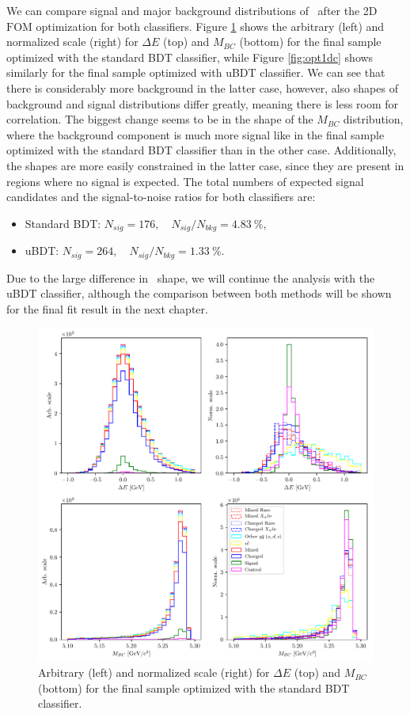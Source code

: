 We can compare signal and major background distributions of \vars~after the 2D $\mathrm{FOM}$ optimization for both classifiers. Figure \ref{fig:opt01c} shows the arbitrary (left) and normalized scale (right) for $\Delta E$ (top) and $M_{BC}$ (bottom) for the final sample optimized with the standard BDT classifier, while Figure \ref{fig:opt1dc} shows similarly for the final sample optimized with uBDT classifier. We can see that there is considerably more background in the latter case, however, also shapes of background and signal distributions differ greatly, meaning there is less room for correlation. The biggest change seems to be in the shape of the $M_{BC}$ distribution, where the background component is much more signal like in the final sample optimized with the standard BDT classifier than in the other case.  Additionally, the shapes are more easily constrained in the latter case, since they are present in regions where no signal is expected. The total numbers of expected signal candidates and the signal-to-noise ratios for both classifiers are:
\begin{itemize}
	\item Standard BDT: $N_{sig} = 176,\quad N_{sig}/N_{bkg} = 4.83~\%$,
	\item uBDT: $N_{sig} = 264,\quad N_{sig}/N_{bkg} = 1.33~\%$.
\end{itemize}
Due to the large difference in \vars~shape, we will continue the analysis with the uBDT classifier, although the comparison between both methods will be shown for the final fit result in the next chapter.

\begin{figure}[H]
	\centering
	\captionsetup{width=0.8\linewidth}
	\includegraphics[width=\linewidth]{fig/opt_BB}
	\caption{Arbitrary (left) and normalized scale (right) for $\Delta E$ (top) and $M_{BC}$ (bottom) for the final sample optimized with the standard BDT classifier.}
	\label{fig:opt01c}
\end{figure} 

